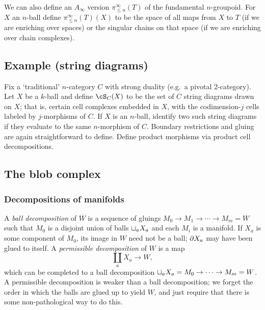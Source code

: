 \documentclass{pnastwo}
\begin{document}
\begin{article}
We can also define an $A_\infty$ version $\pi_{\le n}^\infty(T)$ of the fundamental $n$-groupoid.
For $X$ an $n$-ball define $\pi_{\le n}^\infty(T)(X)$ to be the space of all maps from $X$ to $T$
(if we are enriching over spaces) or the singular chains on that space (if we are enriching over chain complexes).


\subsection{Example (string diagrams)}
Fix a `traditional' $n$-category $C$ with strong duality (e.g.\ a pivotal 2-category).
Let $X$ be a $k$-ball and define $\cS_C(X)$ to be the set of $C$ string diagrams drawn on $X$;
that is, certain cell complexes embedded in $X$, with the codimension-$j$ cells labeled by $j$-morphisms of $C$.
If $X$ is an $n$-ball, identify two such string diagrams if they evaluate to the same $n$-morphism of $C$.
Boundary restrictions and gluing are again straightforward to define.
Define product morphisms via product cell decompositions.



\subsection{The blob complex}
\subsubsection{Decompositions of manifolds}


A \emph{ball decomposition} of $W$ is a 
sequence of gluings $M_0\to M_1\to\cdots\to M_m = W$ such that $M_0$ is a disjoint union of balls
$\sqcup_a X_a$ and each $M_i$ is a manifold.
If $X_a$ is some component of $M_0$, its image in $W$ need not be a ball; $\partial X_a$ may have been glued to itself.
A {\it permissible decomposition} of $W$ is a map
\[
	\coprod_a X_a \to W,
\]
which can be completed to a ball decomposition $\sqcup_a X_a = M_0\to\cdots\to M_m = W$.
A permissible decomposition is weaker than a ball decomposition; we forget the order in which the balls
are glued up to yield $W$, and just require that there is some non-pathological way to do this.


\end{article}
\end{document}
